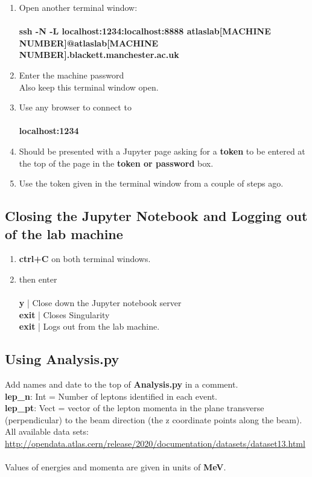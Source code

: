 \documentclass[11pt]{article}
\newcommand{\<}{\guilsinglleft}
\renewcommand{\>}{\guilsinglright}
\begin{document}
\begin{enumerate}
        \item Open another terminal window:
        \\\\
        \textbf{ssh -N -L localhost:1234:localhost:8888 atlaslab[MACHINE NUMBER]@atlaslab[MACHINE NUMBER].blackett.manchester.ac.uk}

        \item Enter the machine password  \\
        Also keep this terminal window open.

        \item Use any browser to connect to 
        \\\\
        \textbf{localhost:1234}

        \item Should be presented with a Jupyter page asking for a \textbf{token} to be entered at the top of the page in the \textbf{token or password} box.

        \item Use the token given in the terminal window from a couple of steps ago.
    \end{enumerate}

    \subsection{Closing the Jupyter Notebook and Logging out of the lab machine}
    \begin{enumerate}
        \item \textbf{ctrl+C} on both terminal windows.
        \item then enter
        \\\\
        \textbf{y} | Close down the Jupyter notebook server\\
        \textbf{exit} | Closes Singularity\\
        \textbf{exit} | Logs out from the lab machine.
    \end{enumerate}

    \subsection{Using Analysis.py}
    Add names and date to the top of \textbf{Analysis.py} in a comment.\\
    \textbf{lep\_n}: Int = Number of leptons identified in each event.\\
    \textbf{lep\_pt}: Vect = vector of the lepton momenta in the plane transverse (perpendicular) to the beam direction (the z coordinate points along the beam).\\
    All available data sets: \url{http://opendata.atlas.cern/release/2020/documentation/datasets/dataset13.html}\\\\
    Values of energies and momenta are given in units of \textbf{MeV}.
\end{document}
